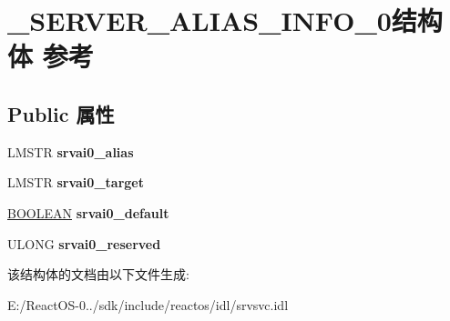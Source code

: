 \hypertarget{struct___s_e_r_v_e_r___a_l_i_a_s___i_n_f_o__0}{}\section{\+\_\+\+S\+E\+R\+V\+E\+R\+\_\+\+A\+L\+I\+A\+S\+\_\+\+I\+N\+F\+O\+\_\+0结构体 参考}
\label{struct___s_e_r_v_e_r___a_l_i_a_s___i_n_f_o__0}
\subsection*{Public 属性}
\begin{DoxyCompactItemize}
\item 
\mbox{\label{struct___s_e_r_v_e_r___a_l_i_a_s___i_n_f_o__0_afdf745853f8e017967b96ab11dd3d22e}} 
L\+M\+S\+TR {\bfseries srvai0\+\_\+alias}
\item 
\mbox{\label{struct___s_e_r_v_e_r___a_l_i_a_s___i_n_f_o__0_a5aeb1987efc38f3000dcc9d8b799c4dd}} 
L\+M\+S\+TR {\bfseries srvai0\+\_\+target}
\item 
\mbox{\label{struct___s_e_r_v_e_r___a_l_i_a_s___i_n_f_o__0_a815c1d9858e5d56732642e26e34fb422}} 
\hyperlink{_processor_bind_8h_a112e3146cb38b6ee95e64d85842e380a}{B\+O\+O\+L\+E\+AN} {\bfseries srvai0\+\_\+default}
\item 
\mbox{\label{struct___s_e_r_v_e_r___a_l_i_a_s___i_n_f_o__0_aca3d379def978dacd54d4a9735562d32}} 
U\+L\+O\+NG {\bfseries srvai0\+\_\+reserved}
\end{DoxyCompactItemize}


该结构体的文档由以下文件生成\+:\begin{DoxyCompactItemize}
\item 
E\+:/\+React\+O\+S-\/0../sdk/include/reactos/idl/srvsvc.\+idl\end{DoxyCompactItemize}
